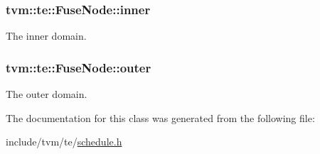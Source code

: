 \subsubsection[{\texorpdfstring{inner}{inner}}]{ tvm\+::te\+::\+Fuse\+Node\+::inner}\hypertarget{classtvm_1_1te_1_1FuseNode_a5a867854c20179cd32b19fb1eab90616}{}\label{classtvm_1_1te_1_1FuseNode_a5a867854c20179cd32b19fb1eab90616}


The inner domain. 

\subsubsection[{\texorpdfstring{outer}{outer}}]{ tvm\+::te\+::\+Fuse\+Node\+::outer}\hypertarget{classtvm_1_1te_1_1FuseNode_a90efca7f5397eb34989f5d085ae9bab5}{}\label{classtvm_1_1te_1_1FuseNode_a90efca7f5397eb34989f5d085ae9bab5}


The outer domain. 



The documentation for this class was generated from the following file\+:\begin{DoxyCompactItemize}
\item 
include/tvm/te/\hyperlink{schedule_8h}{schedule.\+h}\end{DoxyCompactItemize}
